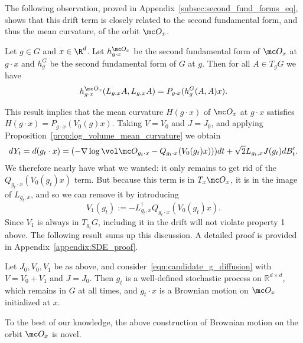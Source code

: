 \documentclass[twoside,a4paper,11pt]{article}
\theoremstyle{plain}
\begin{document}
The following observation, proved in Appendix~\ref{subsec:second_fund_forms_eq}, shows that
this drift term is closely related to the second fundamental
form, and thus the mean curvature, of the orbit $\mc O_x$.
\begin{lemma}
\label{lem:second_fund_forms_eq}
Let $g \in G$ and $x \in \R^d$.
Let $h_{g \cdot x}^{\mc O_x}$ be the second
fundamental form of $\mc O_x$ at $g \cdot x$
and $h^G_g$ be the second fundamental form
of $G$ at $g$.
Then for all $A \in T_{g} G$ we have
$$
h_{g \cdot x}^{\mc O_x} (L_{g, x}A,L_{g,x}A) = 
P_{g \cdot x}(h^G_g(A, A) x).
$$
\end{lemma}
This result implies that the mean curvature $H(g\cdot x)$
of $\mc O_x$ at $g \cdot x$ satisfies
$
H(g\cdot x) = P_{g \cdot x} (V_0(g)x).
$
Taking $V = V_0$ and $J = J_0$, and
applying Proposition~\ref{prop:log_volume_mean_curvature}
we obtain
\begin{align*}
dY_t = d(g_t \cdot x) = 
(-\nabla \log \vol \mc O_{g_t \cdot x} - Q_{g_t \cdot x}(V_0(g_t)x)))dt + \sqrt{2} L_{g_t, x}J(g_t)dB_t'.
\end{align*}
We therefore nearly have what we wanted: it only remains
to get rid of the $Q_{g_t \cdot x} (V_0(g_t)x)$ term.
But because this term is in $T_x \mc O_x$,
it is in the image of $ L_{g_t, x}$,
and so
we can remove it by introducing
$$
V_1(g_t) :=-L_{g_t, x}^{\dagger}Q_{g_t \cdot x}(V_0(g_t)x).
$$ Since $V_1$ is always in $T_{g_t}G$, including it in the drift will not
violate property 1 above. The following result
sums up this discussion. A detailed proof is provided in Appendix~\ref{appendix:SDE_proof}.
\begin{theorem}
\label{thm:BM_on_orbit}
Let $J_0, V_0, V_1$ be as above, and consider~\eqref{eqn:candidate_g_diffusion} 
with $V= V_0 + V_1$ and $J = J_0$. Then $g_t$ 
is a well-defined stochastic process on $\mathbb{R}^{d \times d}$,
which remains in $G$
at all times, and
$g_t \cdot x$ is a
Brownian motion on $\mc O_x$ initialized at $x$.
\end{theorem}

To the best of our knowledge, the above construction
of Brownian motion on the orbit $\mc O_x$ is novel.
\end{document}
